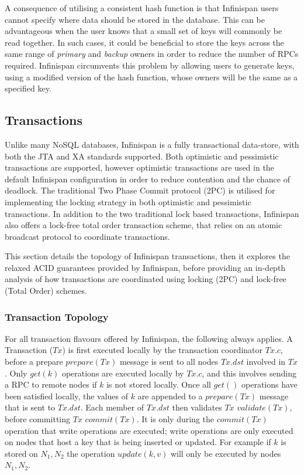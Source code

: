     A consequence of utilising a consistent hash function is that Infinispan users cannot specify where data should be stored in the database. This can be advantageous when the user knows that a small set of keys will commonly be read together.  In such cases, it could be beneficial to store the keys across the same range of \emph{primary} and \emph{backup} owners in order to reduce the number of RPCs required.  Infinispan circumvents this problem by allowing users to generate keys, using a modified version of the hash function, whose owners will be the same as a specified key.  
    
    \subsection{Transactions}
    Unlike many NoSQL databases, Infinispan is a fully transactional data-store, with both the JTA\citep{JTA} and XA\citep{XA} standards supported.  Both optimistic\citep{Kung:1981:OMC:319566.319567} and pessimistic transactions\citep{Bernstein:1981:CCD:356842.356846} are supported, however optimistic transactions are used in the default Infinispan configuration in order to reduce contention and the chance of deadlock.  The traditional Two Phase Commit protocol (2PC)\citep{Bernstein:1996:PTP:261193} is utilised for implementing the locking strategy in both optimistic and pessimistic transactions.  In addition to the two traditional lock based transactions, Infinispan also offers a lock-free total order transaction scheme, that relies on an atomic broadcast protocol to coordinate transactions.  
	    
    This section details the topology of Infinispan transactions, then it explores the relaxed ACID guarantees provided by Infinispan, before providing an in-depth analysis of how transactions are coordinated using locking (2PC) and lock-free (Total Order) schemes. 
    
		\subsubsection{Transaction Topology}
		For all transaction flavours offered by Infinispan, the following always applies.  A Transaction ($Tx$) is first executed locally by the transaction coordinator $Tx.c$, before a prepare $prepare(Tx)$ message is sent to all nodes $Tx.dst$ involved in $Tx$.  Only $get(k)$ operations are executed locally by $Tx.c$, and this involves sending a RPC to remote nodes if $k$ is not stored locally.  Once all $get()$ operations have been satisfied locally, the values of $k$ are appended to a $prepare(Tx)$ message that is sent to $Tx.dst$.  Each member of $Tx.dst$ then validates $Tx$ $validate(Tx)$, before committing $Tx$ $commit(Tx)$.  It is only during the $commit(Tx)$ operation that write operations are executed; write operations are only executed on nodes that host a key that is being inserted or updated.  For example if $k$ is stored on $N_1, N_2$ the operation $update(k, v)$ will only be executed by nodes $N_1, N_2$.  
		
